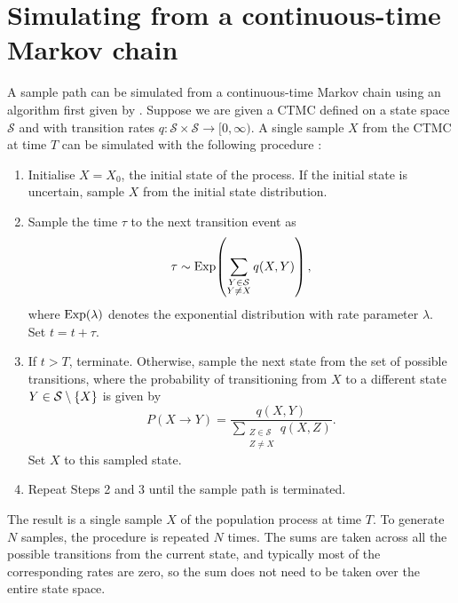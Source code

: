 \section{Simulating from a continuous-time Markov chain}\label{app:ctmc_sim}
A sample path can be simulated from a continuous-time Markov chain using an algorithm first given by \citet{Gillespie_1977_ExactStochasticSimulation}.
Suppose we are given a CTMC defined on a state space \(\mathcal{S}\) and with transition rates \(q\colon \mathcal{S} \times \mathcal{S} \to [0,\infty)\).
A single sample \(X\) from the CTMC at time \(T\) can be simulated with the following procedure \citep{Gillespie_1977_ExactStochasticSimulation}:
\begin{enumerate}
	\item Initialise \(X = X_0\), the initial state of the process.
	      If the initial state is uncertain, sample \(X\) from the initial state distribution.

	\item Sample the time \(\tau\) to the next transition event as
	      \[
		      \tau \sim\mathrm{Exp}\!\left(\sum_{\substack{Y \in \mathcal{S} \\ Y \neq X}}{q\!\left(X, Y\right)}\right),
	      \]
	      where \(\mathrm{Exp}\!\left(\lambda\right)\) denotes the exponential distribution with rate parameter \(\lambda\).
	      Set \(t = t + \tau\).

	\item If \(t > T\), terminate.
	      Otherwise, sample the next state from the set of possible transitions, where the probability of transitioning from \(X\) to a different state \(Y \in \mathcal{S}\setminus \set{X}\) is given by
	      \[
		      P\!\left(X \to Y\right) = \frac{q\!\left(X, Y\right)}{\sum_{\substack{Z \in \mathcal{S} \\ Z \neq X}}{q\!\left(X, Z\right)}}.
	      \]
	      Set \(X\) to this sampled state.

	\item Repeat Steps 2 and 3 until the sample path is terminated.

\end{enumerate}
The result is a single sample \(X\) of the population process at time \(T\).
To generate \(N\) samples, the procedure is repeated \(N\) times.
The sums are taken across all the possible transitions from the current state, and typically most of the corresponding rates are zero, so the sum does not need to be taken over the entire state space.


